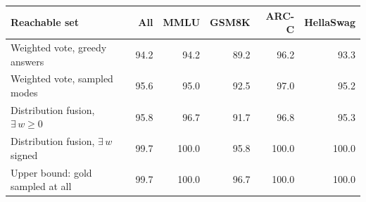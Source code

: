 \begin{tabular}{lrrrrr}
\toprule
Reachable set & All & MMLU & GSM8K & ARC-C & HellaSwag \\
\midrule
Weighted vote, greedy answers & 94.2 & 94.2 & 89.2 & 96.2 & 93.3 \\
Weighted vote, sampled modes & 95.6 & 95.0 & 92.5 & 97.0 & 95.2 \\
Distribution fusion, $\exists\,w \ge 0$ & 95.8 & 96.7 & 91.7 & 96.8 & 95.3 \\
Distribution fusion, $\exists\,w$ signed & 99.7 & 100.0 & 95.8 & 100.0 & 100.0 \\
Upper bound: gold sampled at all & 99.7 & 100.0 & 96.7 & 100.0 & 100.0 \\
\bottomrule
\end{tabular}
